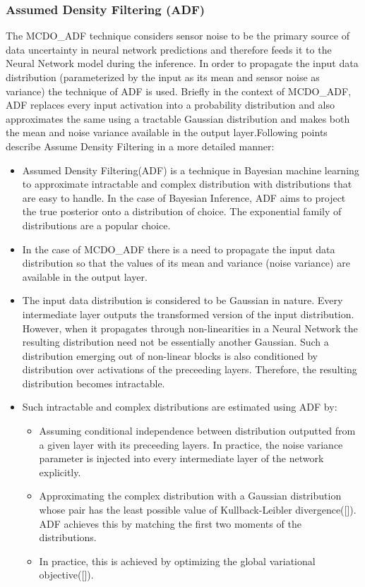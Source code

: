 	\subsubsection{Assumed Density Filtering (ADF)}
	The MCDO\_ADF technique considers sensor noise to be the primary source of data uncertainty in neural network predictions and therefore feeds it to the Neural Network model during the inference. In order to propagate the input data distribution (parameterized by the input as its mean and sensor noise as variance) the technique of ADF is used. Briefly in the context of MCDO\_ADF, ADF replaces every input activation into a probability distribution and also approximates the same using a tractable Gaussian distribution and makes both the mean and noise variance available in the output layer.Following points describe Assume Density Filtering in a more detailed manner:
	\begin{itemize}
		\item Assumed Density Filtering(ADF) is a technique in Bayesian machine learning to approximate intractable and complex distribution with distributions that are easy to handle. In the case of Bayesian Inference, ADF aims to project the true posterior onto a distribution of choice. The exponential family of distributions are a popular choice.
		\item In the case of MCDO\_ADF there is a need to propagate the input data distribution so that the values of its mean and variance (noise variance) are available in the output layer. 
		\item The input data distribution is considered to be Gaussian in nature. Every intermediate layer outputs the transformed version of the input distribution.  However, when it propagates through non-linearities in a Neural Network the resulting distribution need not be essentially another Gaussian. Such a distribution emerging out of non-linear blocks is also conditioned by distribution over activations of the preceeding layers. Therefore, the resulting distribution becomes intractable.
		\item Such intractable and complex distributions are estimated using ADF by:
		\begin{itemize}
			\item Assuming conditional independence between distribution outputted from a given layer with its preceeding layers. In practice, the noise variance parameter is injected into every intermediate layer of the network explicitly.
			\item Approximating the complex distribution with a Gaussian distribution whose pair has the least possible value of Kullback-Leibler divergence([]). ADF achieves this by matching the first two moments of the distributions.
			\item In practice, this is achieved by optimizing the global variational objective([]).
		\end{itemize} 
	\end{itemize}
